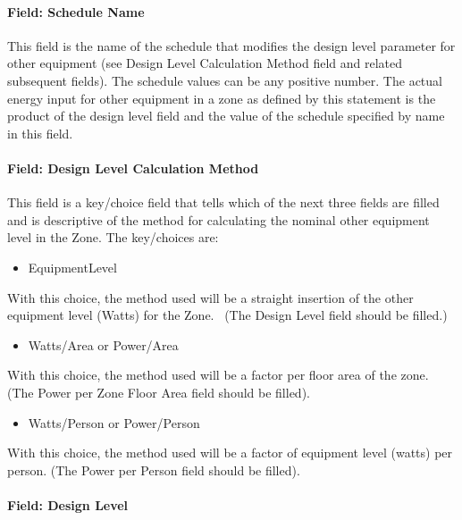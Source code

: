 \paragraph{Field: Schedule Name}\label{field-schedule-name-5-000}

This field is the name of the schedule that modifies the design level parameter for other equipment (see Design Level Calculation Method field and related subsequent fields). The schedule values can be any positive number. The actual energy input for other equipment in a zone as defined by this statement is the product of the design level field and the value of the schedule specified by name in this field.

\paragraph{Field: Design Level Calculation Method}\label{field-design-level-calculation-method-5}

This field is a key/choice field that tells which of the next three fields are filled and is descriptive of the method for calculating the nominal other equipment level in the Zone. The key/choices are:

\begin{itemize}
\tightlist
\item
  EquipmentLevel
\end{itemize}

With this choice, the method used will be a straight insertion of the other equipment level (Watts) for the Zone.~ (The Design Level field should be filled.)

\begin{itemize}
\tightlist
\item
  Watts/Area or Power/Area
\end{itemize}

With this choice, the method used will be a factor per floor area of the zone. (The Power per Zone Floor Area field should be filled).

\begin{itemize}
\tightlist
\item
  Watts/Person or Power/Person
\end{itemize}

With this choice, the method used will be a factor of equipment level (watts) per person. (The Power per Person field should be filled).

\paragraph{Field: Design Level}\label{field-design-level-4}

